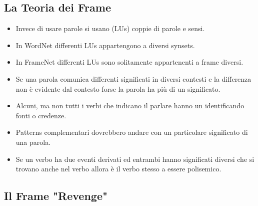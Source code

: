 \subsection{La Teoria dei Frame}




\begin{itemize}
  \item Invece di usare parole si usano  (LUs) coppie di parole e sensi. 
  \item In WordNet differenti LUs appartengono a diversi synsets. 
  \item In FrameNet differenti LUs sono solitamente appartenenti a frame diversi. 
  \item Se una parola comunica differenti significati in diversi contesti e la differenza non è evidente dal contesto forse la parola ha più di un significato.  
  \item Alcuni, ma non tutti  i verbi che indicano il parlare hanno un  identificando fonti o credenze.
  \item Patterns complementari dovrebbero andare con un particolare significato di una parola. 
  \item Se un verbo ha due eventi derivati ed entrambi hanno significati diversi che si trovano anche nel verbo allora è il verbo stesso a essere polisemico.
\end{itemize}


\subsection{Il Frame "Revenge"}

